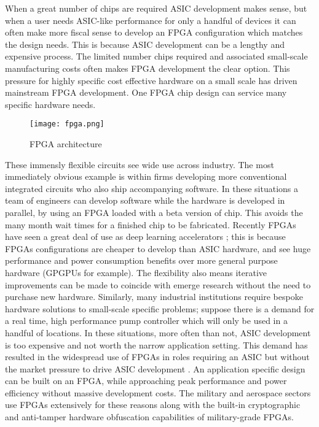 When a great number of chips are required ASIC development makes sense, but when a user needs
ASIC-like performance for only a handful of devices it can often make more fiscal sense
to develop an FPGA configuration which matches the design needs.
This is because ASIC development can
be a lengthy and expensive process.
The limited number chips required and associated small-scale manufacturing
costs often makes FPGA development the clear option. This pressure for highly specific cost
effective hardware on a small scale
has driven mainstream FPGA development. One FPGA chip design can service many specific
hardware needs.

\begin{figure}
\centering
\texttt{[image: fpga.png]}
\caption{FPGA architecture}
\label{fig:fpga}
\end{figure}

These immensly flexible circuits see wide use across industry. The most immediately
obvious example is
within firms developing more conventional integrated circuits who also ship accompanying
software. In these situations a team of engineers can develop software
while the hardware is developed in parallel, by using an FPGA loaded with a beta version
of chip. This avoids the many month wait times for a finished chip to be fabricated.
Recently FPGAs have seen a great deal of use as deep learning accelerators
\cite{Zhang:2015:OFA:2684746.2689060}; this is because FPGAs
configurations are cheaper to develop than ASIC hardware,
and see huge performance and power consumption benefits over more general purpose
hardware (GPGPUs for example). The flexibility also means iterative improvements
can be made to coincide with emerge research without the need to purchase new
hardware. Similarly, many industrial institutions require
bespoke hardware solutions to small-scale specific problems; suppose there is a
demand for a real time, high performance
pump controller which will only be used in a handful of locations. In these situations,
more often than not, ASIC
development is too expensive and not worth the narrow application setting. This demand has resulted in
the widespread use of FPGAs
in roles requiring an ASIC but without the market pressure to drive ASIC development
\cite{4267891}.
An application specific design can be built on an FPGA, while approaching peak performance and power
efficiency without massive development costs.
The military \cite{1346835} and aerospace \cite{henaut2009fpga} sectors use FPGAs extensively for these reasons along with
the built-in cryptographic and anti-tamper hardware obfuscation capabilities of
military-grade FPGAs.

